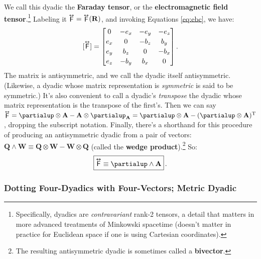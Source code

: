 \documentclass[12pt]{article}
\renewcommand{\vv}[1]{\mathbf{#1}}
\newcommand{\tightoverset}[2]{%
  \mathop{#2}\limits^{\vbox to -.5ex{\kern-0.75ex\hbox{$#1$}\vss}}}
\newcommand{\inlinedy}[1]{\tightoverset{\text{\tiny$\bm\leftrightarrow$}}{#1}}
\newcommand{\capdy}[1]{ \overset{ \text{\tiny$\bm\leftrightarrow$} }{\vphantom{\text{\small{A}}}\smash{#1}} }
\begin{document}
We call this dyadic the \textbf{Faraday tensor}, or the \textbf{electromagnetic field tensor}.\footnote{\label{fn:dy}Specifically, dyadics are \emph{contravariant} rank-2 tensors, a detail that matters in more advanced treatments of Minkowski spacetime (doesn't matter in practice for Euclidean space if one is using Cartesian coordinates).} Labeling it $\inlinedy{\mathsf{F}} = \inlinedy{\mathsf{F}} (\vv R)$, and invoking Equations \ref{eq:ebc}, we have:
\begin{equation}\label{eq:emt}
[\capdy{\mathsf{F}}]
=
\begin{bmatrix}
0 & -e_x & -e_y & -e_z \\[.5ex]
e_x & 0 & -b_z & b_y \\[.5ex]
e_y & b_z & 0 & -b_x \\[.5ex]
e_z & -b_y & b_x & 0
\end{bmatrix} .
\end{equation}
The matrix is antisymmetric, and we call the dyadic itself antisymmetric. (Likewise, a dyadic whose matrix representation is \emph{symmetric} is said to be symmetric.) It's also convenient to call a dyadic's \emph{transpose} the dyadic whose matrix representation is the transpose of the first's. Then we can say ${\inlinedy{\mathsf{F}} = \partialup \otimes \vv A - \vv A \otimes \partialup_{\vv A} = \partialup \otimes \vv A - (\partialup \otimes \vv A)^\mathrm{T}}$, dropping the subscript notation. Finally, there's a shorthand for this procedure of producing an antisymmetric dyadic from a pair of vectors: $\vv Q \wedge \vv W \equiv \vv Q \otimes \vv W - \vv W \otimes \vv Q$ (called the \textbf{wedge product}).\footnote{The resulting antisymmetric dyadic is sometimes called a \textbf{bivector}.} So:
\begin{equation}\label{eq:emta}
\boxed{ \vphantom{A_{A_A}} \capdy{\mathsf{F}} \equiv \partialup \wedge \vv A } \, . 
\end{equation}

\subsubsection{Dotting Four-Dyadics with Four-Vectors; Metric Dyadic}
\end{document}
